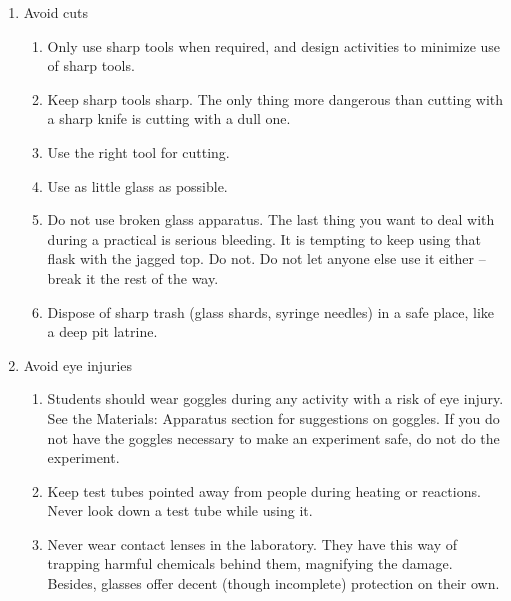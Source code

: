 \begin{enumerate}
\item{Avoid cuts}
\begin{enumerate}
\item{Only use sharp tools when required, 
and design activities to minimize use of sharp tools.}
\item{Keep sharp tools sharp. 
The only thing more dangerous than cutting with a sharp knife 
is cutting with a dull one.}
\item{Use the right tool for cutting.}
\item{Use as little glass as possible.}
\item{Do not use broken glass apparatus. 
The last thing you want to deal with during a practical is serious bleeding. 
It is tempting to keep using that flask with the jagged top. 
Do not. 
Do not let anyone else use it either -- break it the rest of the way.}
\item{Dispose of sharp trash (glass shards, syringe needles) 
in a safe place, like a deep pit latrine.}
\end{enumerate}

\item{Avoid eye injuries}
\begin{enumerate}
\item{Students should wear goggles during any activity 
with a risk of eye injury. 
See the Materials: Apparatus section for suggestions on goggles. 
If you do not have the goggles necessary to make an experiment safe, 
do not do the experiment.}
\item{Keep test tubes pointed away from people during heating or reactions. 
Never look down a test tube while using it.}
\item{Never wear contact lenses in the laboratory. 
They have this way of trapping harmful chemicals behind them, 
magnifying the damage. 
Besides, glasses offer decent (though incomplete) protection on their own.}
\end{enumerate}


\end{enumerate}
